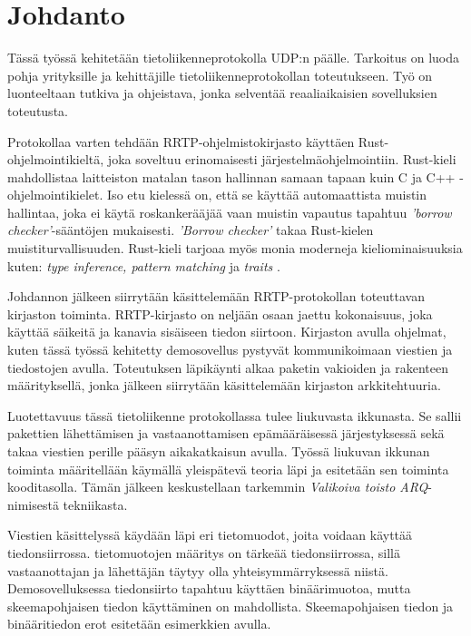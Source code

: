 \documentclass[a4paper,12pt]{article}
\begin{document}
\pagestyle{fancy}

    \section{Johdanto}\label{sec:johdanto}
    Tässä työssä kehitetään tietoliikenneprotokolla UDP:n päälle. Tarkoitus on luoda pohja yrityksille ja kehittäjille tietoliikenneprotokollan toteutukseen.
    Työ on luonteeltaan tutkiva ja ohjeistava, jonka selventää reaaliaikaisien sovelluksien toteutusta.\par

    Protokollaa varten tehdään RRTP-ohjelmistokirjasto käyttäen Rust-ohjelmointikieltä, joka soveltuu erinomaisesti järjestelmäohjelmointiin. Rust-kieli mahdollistaa laitteiston matalan tason hallinnan
    samaan tapaan kuin C ja C++ -ohjelmointikielet. Iso etu kielessä on, että se käyttää automaattista muistin hallintaa, joka ei käytä roskankerääjää vaan muistin vapautus tapahtuu \textit{'borrow checker'}-sääntöjen mukaisesti.
    \textit{'Borrow checker'} takaa Rust-kielen muistiturvallisuuden. 
    Rust-kieli tarjoaa myös monia moderneja kieliominaisuuksia kuten: \textit{type
    inference, pattern matching} ja \textit{traits} \cite{rust-book}.

    Johdannon jälkeen siirrytään käsittelemään RRTP-protokollan toteuttavan kirjaston toiminta. RRTP-kirjasto on neljään osaan jaettu kokonaisuus, joka käyttää säikeitä ja kanavia sisäiseen tiedon siirtoon. Kirjaston avulla ohjelmat, kuten tässä työssä kehitetty demosovellus pystyvät kommunikoimaan viestien ja tiedostojen avulla. 
    Toteutuksen läpikäynti alkaa paketin vakioiden ja rakenteen määrityksellä, jonka jälkeen siirrytään käsittelemään kirjaston arkkitehtuuria. \par

    Luotettavuus tässä tietoliikenne protokollassa tulee liukuvasta ikkunasta. Se sallii pakettien lähettämisen ja vastaanottamisen epämääräisessä järjestyksessä sekä takaa viestien perille pääsyn aikakatkaisun avulla. Työssä liukuvan ikkunan toiminta määritellään käymällä yleispätevä teoria läpi ja esitetään sen toiminta kooditasolla. Tämän jälkeen keskustellaan tarkemmin \textit{Valikoiva toisto ARQ}-nimisestä tekniikasta. \par

    Viestien käsittelyssä käydään läpi eri tietomuodot, joita voidaan käyttää tiedonsiirrossa. tietomuotojen määritys on tärkeää tiedonsiirrossa, sillä vastaanottajan ja lähettäjän täytyy olla yhteisymmärryksessä niistä. Demosovelluksessa tiedonsiirto tapahtuu käyttäen binäärimuotoa, mutta skeemapohjaisen tiedon käyttäminen on mahdollista. Skeemapohjaisen tiedon ja binääritiedon erot esitetään esimerkkien avulla.\par
\end{document}
